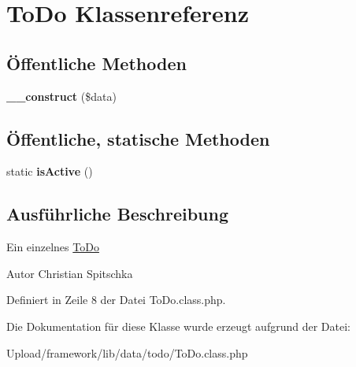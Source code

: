\hypertarget{class_to_do}{}\section{To\+Do Klassenreferenz}
\label{class_to_do}
\subsection*{Öffentliche Methoden}
\begin{DoxyCompactItemize}
\item 
\mbox{\label{class_to_do_a5ebac4049953a509dcc3645f23eeaddd}} 
{\bfseries \+\_\+\+\_\+construct} (\$data)
\end{DoxyCompactItemize}
\subsection*{Öffentliche, statische Methoden}
\begin{DoxyCompactItemize}
\item 
\mbox{\label{class_to_do_a3befd49dc97f298d9162747287094601}} 
static {\bfseries is\+Active} ()
\end{DoxyCompactItemize}


\subsection{Ausführliche Beschreibung}
Ein einzelnes \mbox{\hyperlink{class_to_do}{To\+Do}} \begin{DoxyAuthor}{Autor}
Christian Spitschka 
\end{DoxyAuthor}


Definiert in Zeile 8 der Datei To\+Do.\+class.\+php.



Die Dokumentation für diese Klasse wurde erzeugt aufgrund der Datei\+:\begin{DoxyCompactItemize}
\item 
Upload/framework/lib/data/todo/To\+Do.\+class.\+php\end{DoxyCompactItemize}
